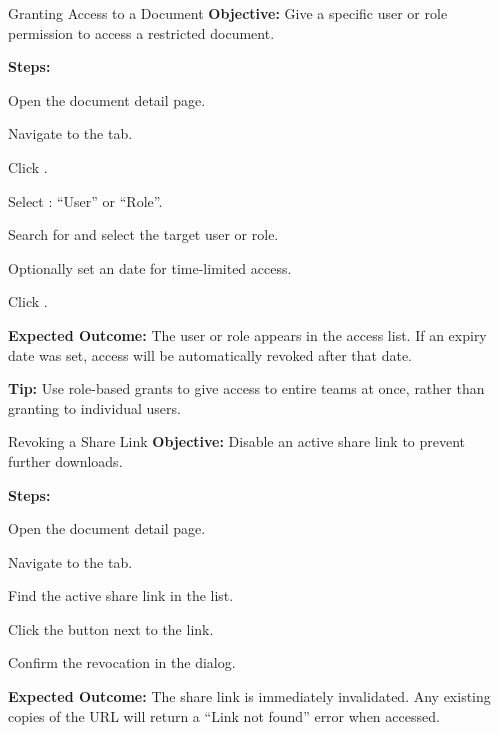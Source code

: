 \vspace{8pt}

\begin{ugTask}{Granting Access to a Document}
  \textbf{Objective:} Give a specific user or role permission
  to access a restricted document.

  \textbf{Steps:}
  \begin{ugSteps}
    \item Open the document detail page.
    \item Navigate to the  tab.
    \item Click .
    \item Select : ``User'' or ``Role''.
    \item Search for and select the target user or role.
    \item Optionally set an  date for
          time-limited access.
    \item Click .
  \end{ugSteps}

  \textbf{Expected Outcome:} The user or role appears in the
  access list. If an expiry date was set, access will be
  automatically revoked after that date.

  \textbf{Tip:} Use role-based grants to give access to entire
  teams at once, rather than granting to individual users.
\end{ugTask}

\vspace{8pt}

\begin{ugTask}{Revoking a Share Link}
  \textbf{Objective:} Disable an active share link to prevent
  further downloads.

  \textbf{Steps:}
  \begin{ugSteps}
    \item Open the document detail page.
    \item Navigate to the  tab.
    \item Find the active share link in the list.
    \item Click the  button next to the link.
    \item Confirm the revocation in the dialog.
  \end{ugSteps}

  \textbf{Expected Outcome:} The share link is immediately
  invalidated. Any existing copies of the URL will return a
  ``Link not found'' error when accessed.
\end{ugTask}

